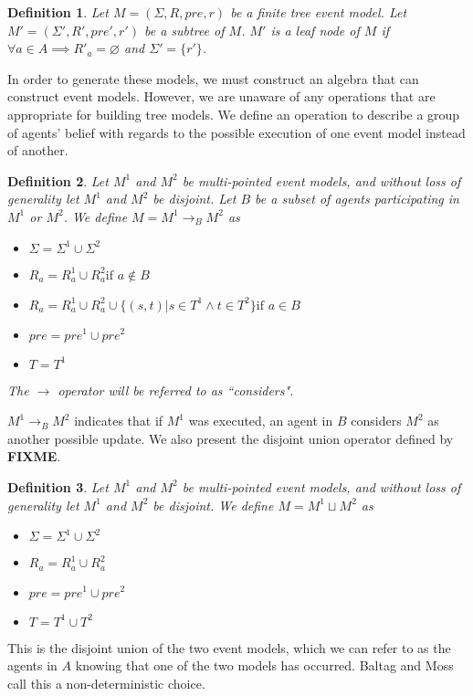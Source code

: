 \documentclass[12pt, a4paper, titlepage]{scrartcl}
\newtheorem{defn}{Definition}[subsection]
\numberwithin{equation}{section}
\newcommand{\FIXME}{{\bf FIXME}}
\begin{document}
\begin{defn} \label{leaf}
Let $M = (\Sigma, R, pre, r)$ be a finite tree event model.
Let $M' = (\Sigma', R', pre', r')$ be a subtree of $M$.
$M'$ is a leaf node of $M$ if $\forall a \in A \implies R'_a = \varnothing$ and $\Sigma' = \{ r'\}$.
\end{defn}

In order to generate these models, we must construct an algebra that can construct event models.
However, we are unaware of any operations that are appropriate for building tree models.
We define an operation to describe a group of agents' belief with regards to the possible execution
of one event model instead of another.

\begin{defn} \label{considers}
Let $M^1$ and $M^2$ be multi-pointed event models, and without loss of
generality let $M^1$ and $M^2$ be disjoint.
Let $B$ be a subset of agents participating in $M^1$ or $M^2$.
We define $M = M^1 \to_B M^2$ as 
\begin{itemize}
  \item $\Sigma = \Sigma^1 \cup \Sigma^2$
  \item $R_a = R^1_a \cup R^2_a \text{if } a \notin B$
	\item $R_a =
      R^1_a \cup
      R^2_a \cup
      \{(s,t) | s \in T^1 \land t \in T^2 \}
    \text{if } a \in B $
  \item $pre = pre^1 \cup pre^2$
  \item $T = T^1$
\end{itemize}
The $\to$ operator will be referred to as ``considers".
\end{defn}

$M^1 \to_B M^2$ indicates that if $M^1$ was executed, an agent in $B$ considers $M^2$ as another
possible update.
We also present the disjoint union operator defined by \FIXME.


\begin{defn} \label{disjoint}
Let $M^1$ and $M^2$ be multi-pointed event models, and without loss of generality let $M^1$ and
$M^2$ be disjoint.
We define $M = M^1 \sqcup M^2$ as
\begin{itemize}
	\item $\Sigma = \Sigma^1 \cup \Sigma^2$
	\item $R_a = R^1_a \cup R^2_a$
	\item $pre = pre^1 \cup pre^2$
	\item $T = T^1 \cup T^2$
\end{itemize}
\end{defn}
This is the disjoint union of the two event models, which we can refer to as the agents in $A$
knowing that one of the two models has occurred.
Baltag and Moss call this a non-deterministic choice.
\end{document}
